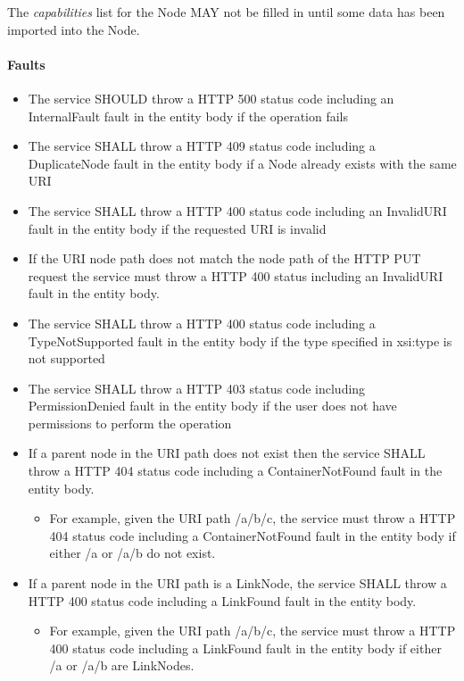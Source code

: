 \documentclass[11pt,a4paper]{ivoa}
\begin{document}
The \emph{capabilities} list for the Node MAY not be filled in until some data has been imported into the Node.

\paragraph{Faults}
\begin{itemize}
    \item The service SHOULD throw a HTTP 500 status code including an InternalFault fault in the entity body if the operation fails
    \item The service SHALL throw a HTTP 409 status code including a DuplicateNode fault in the entity body if a Node already exists with the same URI
    \item The service SHALL throw a HTTP 400 status code including an InvalidURI fault in the entity body if the requested URI is invalid
    \item If the URI node path does not match the node path of the HTTP PUT request the service must throw a HTTP 400 status including an InvalidURI fault in the entity body.
    \item The service SHALL throw a HTTP 400 status code including a TypeNotSupported fault in the entity body if the type specified in xsi:type is not supported
    \item The service SHALL throw a HTTP 403 status code including PermissionDenied fault in the entity body if the user does not have permissions to perform the operation
    \item If a parent node in the URI path does not exist then the service SHALL throw a HTTP 404 status code including a ContainerNotFound fault in the entity body.
    \begin{itemize}
        \item For example, given the URI path /a/b/c, the service must throw a HTTP 404 status code including a ContainerNotFound fault in the entity body if either /a or /a/b do not exist.
    \end{itemize}
    \item If a parent node in the URI path is a LinkNode, the service SHALL throw a HTTP 400 status code including a LinkFound fault in the entity body.
        \begin{itemize}
        \item For example, given the URI path /a/b/c, the service must throw a HTTP 400 status code including a LinkFound fault in the entity body if either /a or /a/b are LinkNodes.
    \end{itemize}
\end{itemize}
\end{document}
